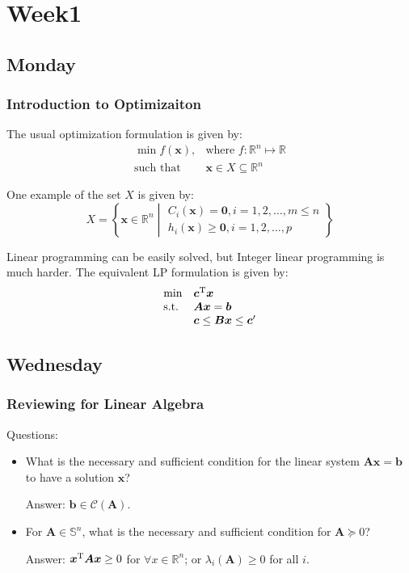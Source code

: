 
\chapter{Week1}

\section{Monday}
\subsection{Introduction to Optimizaiton}
The usual optimization formulation is given by:
\[\begin{array}{ll}
\min f(\bm x),
&
\mbox{where }f:\mathbb{R}^n\mapsto\mathbb{R}
\\
\mbox{such that}
&
\bm x\in X\subseteq\mathbb{R}^n
\end{array}
\]

One example of the set $X$ is given by:
\[
X=\left\{\bm x\in\mathbb{R}^n\middle|
\begin{array}{l}
C_i(\bm x) = \bm0, i=1,2,\dots,m\le n
 \\
 h_i(\bm x)\ge\bm0, i=1,2,\dots,p
\end{array}\right\}
\]

Linear programming can be easily solved, but Integer linear programming is much harder. The equivalent LP formulation is given by:
\[
\begin{array}{ll}
\min
&
\bm c^{\mathrm T}\bm x
\\
\mbox{s.t.}
&
\bm{Ax}=\bm b
\\
&
\bm c\le\bm{Bx}\le \bm c'
\end{array}
\]



\section{Wednesday}

\subsection{Reviewing for Linear Algebra}
Questions:
\begin{itemize}
\item
What is the necessary and sufficient condition for the linear system $\bm A\bm x=\bm b$ to have a solution $\bm x$?

Answer: $\bm b\in\mathcal{C}(\bm A)$.
\item
For $\bm A\in\mathbb{S}^n$, what is the necessary and sufficient condition for $\bm A\succeq0$?

Answer: $\bm x^{\mathrm T}\bm A\bm x\ge0$ for $\forall x\in\mathbb{R}^n$; or $\lambda_i(\bm A)\ge0$ for all $i$.
\end{itemize}
